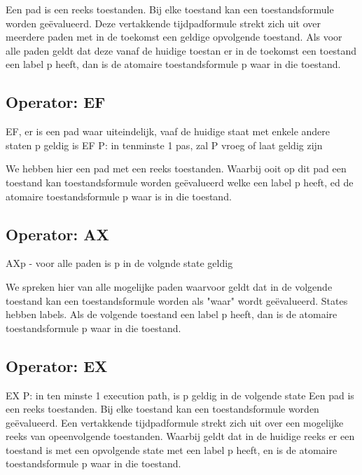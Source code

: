 \documentclass{article}
\begin{document}
	Een pad is een reeks toestanden. Bij elke toestand kan een toestandsformule worden geëvalueerd. Deze vertakkende tijdpadformule strekt zich uit over meerdere paden met in de toekomst een geldige  opvolgende  toestand.
	Als voor alle paden geldt dat deze vanaf de huidige toestan er in  de toekomst een toestand een label p heeft, dan is de atomaire toestandsformule p waar in die toestand.
	
	
	\subsection{Operator: EF}
	EF, er is een pad waar uiteindelijk, vaaf de huidige staat  met enkele andere staten p geldig is
	EF P: in tenminste 1 pas, zal P vroeg of laat geldig zijn
	
	We hebben hier een pad met een reeks toestanden. Waarbij ooit op dit pad een toestand kan  toestandsformule worden geëvalueerd welke  een label p heeft,  ed de atomaire toestandsformule p waar is in die toestand.
	\subsection{Operator: AX}
	AXp - voor alle paden is p in de volgnde state geldig
	
	
	We spreken hier van alle mogelijke paden waarvoor geldt dat in de volgende toestand kan een toestandsformule worden als "waar" wordt geëvalueerd. 
	States hebben labels. Als de volgende toestand een label p heeft, dan is de atomaire toestandsformule p waar in die toestand.
	\subsection{Operator: EX}
	EX P: in ten minste 1 execution path, is p geldig in de volgende state	
	Een pad is een reeks toestanden. Bij elke toestand kan een toestandsformule worden geëvalueerd. Een vertakkende tijdpadformule strekt zich uit over een  mogelijke reeks van opeenvolgende toestanden.
	Waarbij geldt dat in de huidige reeks er een toestand is met een opvolgende state met een label p heeft, en is de atomaire toestandsformule p waar in die toestand.
\end{document}
